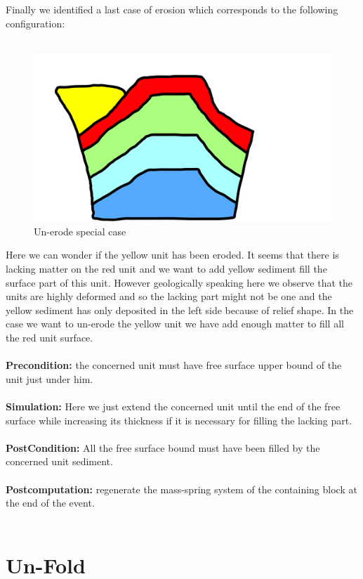 \documentclass[12pt, a4paper]{report} %
\begin{document}
Finally we identified a last case of erosion which corresponds to the following configuration:\\\\
\begin{figure}[H]
	\centering
	\includegraphics[scale=0.3]{unErodeSpecial.png}
	\caption{Un-erode special case}
\end{figure}
Here we can wonder if the yellow unit has been eroded.  It seems that there is lacking matter on the red unit and we want to add yellow sediment fill the surface part of this unit. However geologically speaking here we observe that the units are highly deformed and so the lacking part might not be one and the yellow sediment has only deposited in the left side because of relief shape. In the case we want to un-erode  the yellow unit we have add enough matter to fill all the red unit surface.\\\\
\textbf{Precondition:} the concerned unit must have free surface upper bound of the unit just under him.\\\\
\textbf{Simulation:} Here we just extend the concerned unit until the end of the free surface while increasing its thickness if it is necessary for filling the lacking part.\\\\
\textbf{PostCondition:} All the free surface bound must have been filled by the concerned unit sediment.\\\\
\textbf{Postcomputation:} regenerate the mass-spring system of the containing block at the end of the event.\\\\

\section{Un-Fold}
\end{document}
